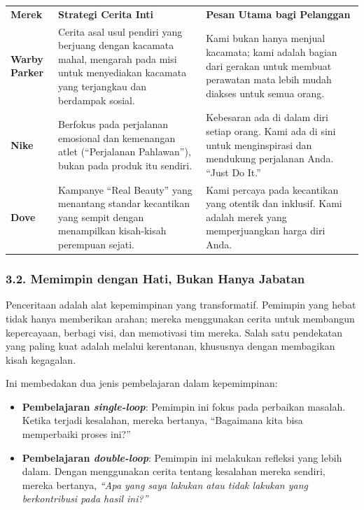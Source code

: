 \documentclass[
  letterpaper,
  DIV=11,
  numbers=noendperiod]{scrreprt}
\begin{document}
\begin{longtable}[]{@{}
  >{\raggedright\arraybackslash}p{}
  >{\raggedright\arraybackslash}p{}
  >{\raggedright\arraybackslash}p{}@{}}
\toprule\noalign{}
\endhead
\bottomrule\noalign{}
\endlastfoot
\textbf{Merek} & \textbf{Strategi Cerita Inti} & \textbf{Pesan Utama
bagi Pelanggan} \\
\textbf{Warby Parker} & Cerita asal usul pendiri yang berjuang dengan
kacamata mahal, mengarah pada misi untuk menyediakan kacamata yang
terjangkau dan berdampak sosial. & Kami bukan hanya menjual kacamata;
kami adalah bagian dari gerakan untuk membuat perawatan mata lebih mudah
diakses untuk semua orang. \\
\textbf{Nike} & Berfokus pada perjalanan emosional dan kemenangan atlet
(``Perjalanan Pahlawan''), bukan pada produk itu sendiri. & Kebesaran
ada di dalam diri setiap orang. Kami ada di sini untuk menginspirasi dan
mendukung perjalanan Anda. ``Just Do It.'' \\
\textbf{Dove} & Kampanye ``Real Beauty'' yang menantang standar
kecantikan yang sempit dengan menampilkan kisah-kisah perempuan sejati.
& Kami percaya pada kecantikan yang otentik dan inklusif. Kami adalah
merek yang memperjuangkan harga diri Anda. \\
\end{longtable}

\subsubsection{3.2. Memimpin dengan Hati, Bukan Hanya
Jabatan}\label{memimpin-dengan-hati-bukan-hanya-jabatan}

Penceritaan adalah alat kepemimpinan yang transformatif. Pemimpin yang
hebat tidak hanya memberikan arahan; mereka menggunakan cerita untuk
membangun kepercayaan, berbagi visi, dan memotivasi tim mereka. Salah
satu pendekatan yang paling kuat adalah melalui kerentanan, khususnya
dengan membagikan kisah kegagalan.

Ini membedakan dua jenis pembelajaran dalam kepemimpinan:

\begin{itemize}
\item
  \textbf{Pembelajaran \emph{single-loop}}: Pemimpin ini fokus pada
  perbaikan masalah. Ketika terjadi kesalahan, mereka bertanya,
  ``Bagaimana kita bisa memperbaiki proses ini?''
\item
  \textbf{Pembelajaran \emph{double-loop}}: Pemimpin ini melakukan
  refleksi yang lebih dalam. Dengan menggunakan cerita tentang kesalahan
  mereka sendiri, mereka bertanya, \emph{``Apa yang saya lakukan atau
  tidak lakukan yang berkontribusi pada hasil ini?''}
\end{itemize}
\end{document}
